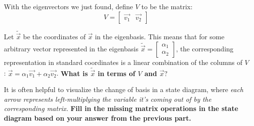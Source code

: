 With the eigenvectors we just found, define $V$ to be the matrix:
$$V = \begin{bmatrix}
\vec{v_1} & \vec{v_2}
\end{bmatrix}$$

\begin{enumerate}[resume]

\qitem Let $\widetilde{\vec{x}}$ be the coordinates of $\vec{x}$ in the eigenbasis. This means that for some arbitrary vector represented in the eigenbasis $\widetilde{\vec{x}} = \begin{bmatrix} \alpha_1 \\ \alpha_2 \end{bmatrix}$, the corresponding representation in standard coordinates is a linear combination of the columns of $V$: $\vec{x} = \alpha_1 \vec{v_1} + \alpha_2 \vec{v_2}$. \textbf{What is $\widetilde{\vec{x}}$ in terms of $V$ and $\vec{x}?$}

\ws{\vspace{3em}}



\qitem It is often helpful to visualize the change of basis in a state diagram, where \textit{each arrow represents left-multiplying the variable it's coming out of by the corresponding matrix.} \textbf{Fill in the missing matrix operations in the state diagram based on your answer from the previous part.}



\end{enumerate}
